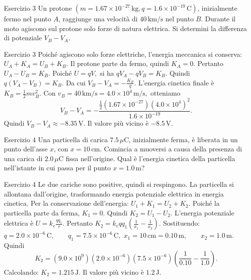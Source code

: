\documentclass[a4paper]{article}
\begin{document}
\begin{snippetexercise}{Esercizio 3}
    Un protone \(\left(m = 1.67 \times 10^{-27}\,\mathrm{kg},
    q = 1.6 \times 10^{-19}\,\mathrm{C}\right)\), inizialmente fermo nel
    punto \(A\), raggiunge una velocità di \(40\,\mathrm{km/s}\) nel punto
    \(B\). Durante il moto agiscono sul protone solo forze di natura elettrica.
    Si determini la differenza di potenziale \(V_B - V_A\).

\end{snippetexercise}
\begin{snippetsolution}{Esercizio 3}
    Poiché agiscono solo forze elettriche, l'energia meccanica si conserva:
    \(U_A + K_A = U_B + K_B.\)
    Il protone parte da fermo, quindi
    \(K_A = 0.\)
    Pertanto
    \(U_A - U_B = K_B.\)
    Poiché
    \(U = qV,\)
    si ha
    \(qV_A - qV_B = K_B.\)
    Quindi
    \(q(V_A - V_B) = K_B.\)
    Da cui
    \(V_B - V_A = -\frac{K_B}{q}.\)
    L'energia cinetica finale è
    \(K_B = \frac{1}{2}mv_B^2.\)
    Con
    \(v_B = 40\,\mathrm{km/s} = 4.0 \times 10^4\,\mathrm{m/s},\)
    otteniamo
    \[
        V_B - V_A
        =
        -\frac{
            \frac{1}{2}
            \left(1.67 \times 10^{-27}\right)
            \left(4.0 \times 10^4\right)^2
        }{
            1.6 \times 10^{-19}
        }.
    \]
    Quindi
    \(V_B - V_A \approx -8.35\,\mathrm{V}.\)
    Il valore più vicino è
    \(\boxed{-8.5\,\mathrm{V}}.\)
\end{snippetsolution}
\begin{snippetexercise}{Esercizio 4}
    Una particella di carica \(7.5\,\mu\mathrm{C}\), inizialmente ferma, è
    liberata in un punto dell'asse \(x\), con \(x = 10\,\mathrm{cm}\). Comincia
    a muoversi a causa della presenza di una carica di \(2.0\,\mu\mathrm{C}\)
    fissa nell'origine. Qual è l'energia cinetica della particella nell'istante
    in cui passa per il punto \(x = 1.0\,\mathrm{m}\)?

\end{snippetexercise}
\begin{snippetsolution}{Esercizio 4}
    Le due cariche sono positive, quindi si respingono. La particella si
    allontana dall'origine, trasformando energia potenziale elettrica in
    energia cinetica.
    Per la conservazione dell'energia:
    \(U_1 + K_1 = U_2 + K_2.\)
    Poiché la particella parte da ferma,
    \(K_1 = 0.\)
    Quindi
    \(K_2 = U_1 - U_2.\)
    L'energia potenziale elettrica è
    \(U = k_e\frac{qq_1}{r}.\)
    Pertanto
    \(K_2 = k_e qq_1 \left( \frac{1}{x_1} - \frac{1}{x_2} \right).\)
    Sostituendo:
    \(q = 2.0 \times 10^{-6}\,\mathrm{C}, \qquad q_1 = 7.5 \times 10^{-6}\,\mathrm{C},\)
    \(x_1 = 10\,\mathrm{cm} = 0.10\,\mathrm{m}, \qquad x_2 = 1.0\,\mathrm{m}.\)
    Quindi
    \[
        K_2 =
        \left(9.0 \times 10^9\right)
        \left(2.0 \times 10^{-6}\right)
        \left(7.5 \times 10^{-6}\right)
        \left(
            \frac{1}{0.10} - \frac{1}{1.0}
        \right).
    \]
    Calcolando:
    \(K_2 = 1.215\,\mathrm{J}.\)
    Il valore più vicino è
    \(\boxed{1.2\,\mathrm{J}}.\)
\end{snippetsolution}
\end{document}
